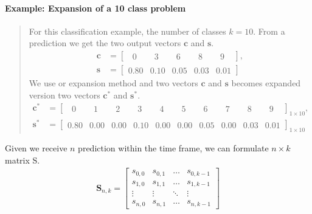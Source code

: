 \paragraph{Example: Expansion of a 10 class problem} 
\blockquote[]{	 	
	For this classification example, the number of classes $k=10$. From a prediction we get the two output vectors $\mathbf{c}$ and $\mathbf{s}$.
	\begin{align*}
	\mathbf{c} &= \begin{bmatrix}
	\phantom{0}0\phantom{.0} & \phantom{0}3\phantom{.0} & \phantom{0}6\phantom{.0} & \phantom{0}8\phantom{.0} & \phantom{0}9\phantom{.0}
	\end{bmatrix},\\
	\mathbf{s} &= \begin{bmatrix}
	0.80 & 0.10 & 0.05 & 0.03 & 0.01
	\end{bmatrix}
	\end{align*}
	We use or expansion method and two vectors $\mathbf{c}$ and $\mathbf{s}$ becomes expanded version two vectors $\mathbf{c^*}$ and $\mathbf{s^*}$.
	\begin{align*}
	\mathbf{c^*} &= \begin{bmatrix}
	\phantom{0}0\phantom{.0} & \phantom{0}1\phantom{.0} & \phantom{0}2\phantom{.0} & \phantom{0}3\phantom{.0} & \phantom{0}4\phantom{.0} & \phantom{0}5\phantom{.0} & \phantom{0}6\phantom{.0} & \phantom{0}7\phantom{.0} & \phantom{0}8\phantom{.0} & \phantom{0}9\phantom{.0}
	\end{bmatrix}_{1 \times 10},\\
	\mathbf{s^*} &= \begin{bmatrix}
	0.80 & 0.00 & 0.00 & 0.10 & 0.00 & 0.00 & 0.05 & 0.00 & 0.03 & 0.01
	\end{bmatrix}_{1 \times 10}
	\end{align*}
}
Given we receive $n$ prediction within the time frame, we can formulate $n \times k$ matrix S. 
\begin{align*}
\mathbf{S}_{n,k} = \begin{bmatrix}
s_{0,0} & s_{0,1} & \dots  & s_{0,k-1} 	\\
s_{1,0} & s_{1,1} & \dots  & s_{1,k-1}	\\
\vdots 	& \vdots  & \ddots & \vdots 	\\
s_{n,0} & s_{n,1} & \dots  & s_{n,k-1}
\end{bmatrix}
\end{align*}      

